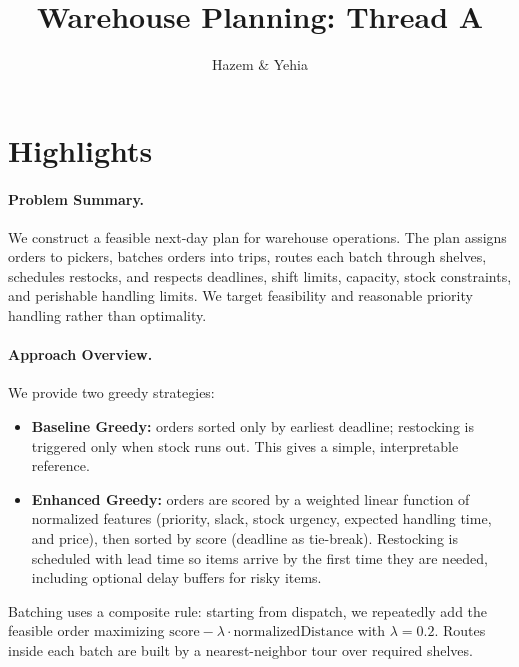 \documentclass[11pt]{article}
\title{Warehouse Planning: Thread A}
\author{Hazem \& Yehia}
\date{}
\begin{document}
\maketitle

\section*{Highlights}
\paragraph{Problem Summary.}
We construct a feasible next-day plan for warehouse operations. The plan assigns orders to pickers, batches orders into trips, routes each batch through shelves, schedules restocks, and respects deadlines, shift limits, capacity, stock constraints, and perishable handling limits. We target feasibility and reasonable priority handling rather than optimality.

\paragraph{Approach Overview.}
We provide two greedy strategies:
\begin{itemize}[leftmargin=1.25em]
    \item \textbf{Baseline Greedy:} orders sorted only by earliest deadline; restocking is triggered only when stock runs out. This gives a simple, interpretable reference.
    \item \textbf{Enhanced Greedy:} orders are scored by a weighted linear function of normalized features (priority, slack, stock urgency, expected handling time, and price), then sorted by score (deadline as tie-break). Restocking is scheduled with lead time so items arrive by the first time they are needed, including optional delay buffers for risky items.
\end{itemize}
Batching uses a composite rule: starting from dispatch, we repeatedly add the feasible order maximizing $\text{score} - \lambda \cdot \text{normalizedDistance}$ with $\lambda=0.2$. Routes inside each batch are built by a nearest-neighbor tour over required shelves.
\end{document}
